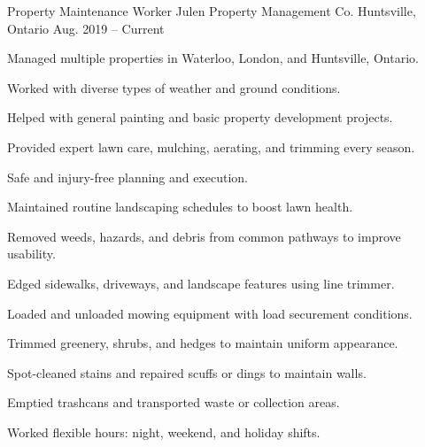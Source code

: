 

\begin{cventries}

  \cventry
    {Property Maintenance Worker} %
    {Julen Property Management Co.} %
    {Huntsville, Ontario} %
    {Aug. 2019 -- Current} %
    {
      \begin{cvitems} %
        \item {Managed multiple properties in Waterloo, London, and Huntsville, Ontario.}
        \item {Worked with diverse types of weather and ground conditions.}
        \item {Helped with general painting and basic property development projects.}
        \item {Provided expert lawn care, mulching, aerating, and trimming every season.}
        \item {Safe and injury-free planning and execution.}
        \item {Maintained routine landscaping schedules to boost lawn health.}
        \item {Removed weeds, hazards, and debris from common pathways to improve usability.}
        \item{Edged sidewalks, driveways, and landscape features using line trimmer.}
        \item{Loaded and unloaded mowing equipment with load securement conditions.}
        \item{Trimmed greenery, shrubs, and hedges to maintain uniform appearance.}
        \item{Spot-cleaned stains and repaired scuffs or dings to maintain walls.}
        \item{Emptied trashcans and transported waste or collection areas.}
        \item{Worked flexible hours: night, weekend, and holiday shifts.}
      \end{cvitems}
    }


\end{cventries}
